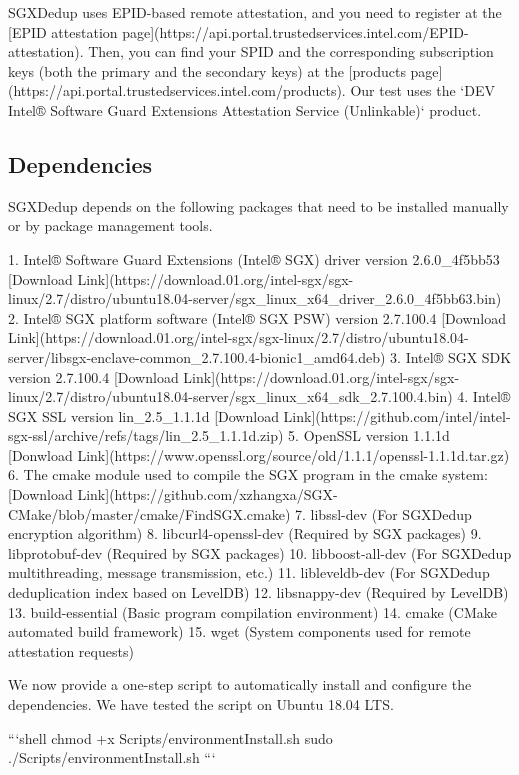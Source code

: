 SGXDedup uses EPID-based remote attestation, and you need to register at the [EPID attestation page](https://api.portal.trustedservices.intel.com/EPID-attestation). Then, you can find your SPID and the corresponding subscription keys (both the primary and the secondary keys) at the [products page](https://api.portal.trustedservices.intel.com/products). Our test uses the `DEV Intel® Software Guard Extensions Attestation Service (Unlinkable)` product.


\subsection{Dependencies}

SGXDedup depends on the following packages that  need to be installed manually or by package management tools.

1. Intel® Software Guard Extensions (Intel® SGX) driver version 2.6.0\_4f5bb53 [Download Link](https://download.01.org/intel-sgx/sgx-linux/2.7/distro/ubuntu18.04-server/sgx\_linux\_x64\_driver\_2.6.0\_4f5bb63.bin)
2. Intel® SGX platform software (Intel® SGX PSW) version 2.7.100.4 [Download Link](https://download.01.org/intel-sgx/sgx-linux/2.7/distro/ubuntu18.04-server/libsgx-enclave-common\_2.7.100.4-bionic1\_amd64.deb)
3. Intel® SGX SDK version 2.7.100.4 [Download Link](https://download.01.org/intel-sgx/sgx-linux/2.7/distro/ubuntu18.04-server/sgx\_linux\_x64\_sdk\_2.7.100.4.bin)
4. Intel® SGX SSL version lin\_2.5\_1.1.1d [Download Link](https://github.com/intel/intel-sgx-ssl/archive/refs/tags/lin\_2.5\_1.1.1d.zip)
5. OpenSSL version 1.1.1d [Donwload Link](https://www.openssl.org/source/old/1.1.1/openssl-1.1.1d.tar.gz)
6. The cmake module used to compile the SGX program in the cmake system: [Download Link](https://github.com/xzhangxa/SGX-CMake/blob/master/cmake/FindSGX.cmake)
7. libssl-dev (For SGXDedup encryption algorithm)
8. libcurl4-openssl-dev (Required by SGX packages)
9. libprotobuf-dev (Required by SGX packages)
10. libboost-all-dev (For SGXDedup multithreading, message transmission, etc.)
11. libleveldb-dev (For SGXDedup deduplication index based on LevelDB)
12. libsnappy-dev (Required by LevelDB)
13. build-essential (Basic program compilation environment)
14. cmake (CMake automated build framework)
15. wget (System components used for remote attestation requests)

We now provide a one-step script to automatically install and configure the dependencies. We have tested the script on Ubuntu 18.04 LTS.

```shell
chmod +x Scripts/environmentInstall.sh
sudo ./Scripts/environmentInstall.sh
```

